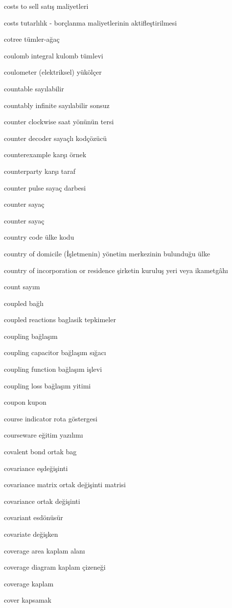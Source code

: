 \documentclass[12pt,fleqn]{article}\usepackage{../../common}
\begin{document}
costs to sell satış maliyetleri

costs tutarlılık - borçlanma maliyetlerinin aktifleştirilmesi

cotree tümler-ağaç

coulomb integral kulomb tümlevi

coulometer (elektriksel) yükölçer

countable sayılabilir

countably infinite sayılabilir sonsuz

counter clockwise saat yönünün tersi

counter decoder sayaçlı kodçözücü

counterexample karşı örnek

counterparty karşı taraf

counter pulse sayaç darbesi

counter sayaç

counter sayaç

country code ülke kodu

country of domicile (İşletmenin) yönetim merkezinin bulunduğu ülke

country of incorporation or residence şirketin kuruluş yeri veya ikametgâhı

count sayım

coupled bağlı

coupled reactions baglasik tepkimeler

coupling bağlaşım

coupling capacitor bağlaşım sığacı

coupling function bağlaşım işlevi

coupling loss bağlaşım yitimi

coupon kupon

course indicator rota göstergesi

courseware eğitim yazılımı

covalent bond ortak bag

covariance eşdeğişinti

covariance matrix ortak değişinti matrisi

covariance ortak değişinti

covariant esdönüsür

covariate değişken

coverage area kaplam alanı

coverage diagram kaplam çizeneği

coverage kaplam

cover kapsamak
\end{document}
